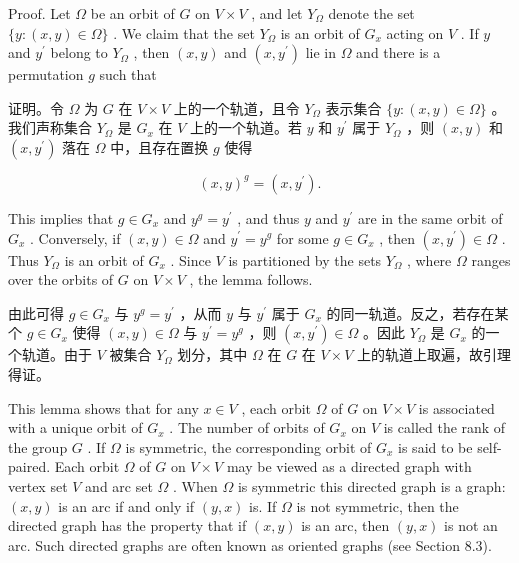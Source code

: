 \documentclass[10pt]{article}
\begin{document}
Proof. Let \(\Omega\) be an orbit of \(G\) on \(V \times  V\) , and let \({Y}_{\Omega }\) denote the set \(\{ y : \left( {x,y}\right)  \in  \Omega \}\) . We claim that the set \({Y}_{\Omega }\) is an orbit of \({G}_{x}\) acting on \(V\) . If \(y\) and \({y}^{\prime }\) belong to \({Y}_{\Omega }\) , then \(\left( {x,y}\right)\) and \(\left( {x,{y}^{\prime }}\right)\) lie in \(\Omega\) and there is a permutation \(g\) such that

\begin{tcolorbox}\relax
证明。令 \(\Omega\) 为 \(G\) 在 \(V \times  V\) 上的一个轨道，且令 \({Y}_{\Omega }\) 表示集合 \(\{ y : \left( {x,y}\right)  \in  \Omega \}\) 。我们声称集合 \({Y}_{\Omega }\) 是 \({G}_{x}\) 在 \(V\) 上的一个轨道。若 \(y\) 和 \({y}^{\prime }\) 属于 \({Y}_{\Omega }\) ，则 \(\left( {x,y}\right)\) 和 \(\left( {x,{y}^{\prime }}\right)\) 落在 \(\Omega\) 中，且存在置换 \(g\) 使得
\end{tcolorbox}

\[
{\left( x,y\right) }^{g} = \left( {x,{y}^{\prime }}\right) .
\]

This implies that \(g \in  {G}_{x}\) and \({y}^{g} = {y}^{\prime }\) , and thus \(y\) and \({y}^{\prime }\) are in the same orbit of \({G}_{x}\) . Conversely, if \(\left( {x,y}\right)  \in  \Omega\) and \({y}^{\prime } = {y}^{g}\) for some \(g \in  {G}_{x}\) , then \(\left( {x,{y}^{\prime }}\right)  \in  \Omega\) . Thus \({Y}_{\Omega }\) is an orbit of \({G}_{x}\) . Since \(V\) is partitioned by the sets \({Y}_{\Omega }\) , where \(\Omega\) ranges over the orbits of \(G\) on \(V \times  V\) , the lemma follows.

\begin{tcolorbox}\relax
由此可得 \(g \in  {G}_{x}\) 与 \({y}^{g} = {y}^{\prime }\) ，从而 \(y\) 与 \({y}^{\prime }\) 属于 \({G}_{x}\) 的同一轨道。反之，若存在某个 \(g \in  {G}_{x}\) 使得 \(\left( {x,y}\right)  \in  \Omega\) 与 \({y}^{\prime } = {y}^{g}\) ，则 \(\left( {x,{y}^{\prime }}\right)  \in  \Omega\) 。因此 \({Y}_{\Omega }\) 是 \({G}_{x}\) 的一个轨道。由于 \(V\) 被集合 \({Y}_{\Omega }\) 划分，其中 \(\Omega\) 在 \(G\) 在 \(V \times  V\) 上的轨道上取遍，故引理得证。
\end{tcolorbox}

This lemma shows that for any \(x \in  V\) , each orbit \(\Omega\) of \(G\) on \(V \times  V\) is associated with a unique orbit of \({G}_{x}\) . The number of orbits of \({G}_{x}\) on \(V\) is called the rank of the group \(G\) . If \(\Omega\) is symmetric, the corresponding orbit of \({G}_{x}\) is said to be self-paired. Each orbit \(\Omega\) of \(G\) on \(V \times  V\) may be viewed as a directed graph with vertex set \(V\) and arc set \(\Omega\) . When \(\Omega\) is symmetric this directed graph is a graph: \(\left( {x,y}\right)\) is an arc if and only if \(\left( {y,x}\right)\) is. If \(\Omega\) is not symmetric, then the directed graph has the property that if \(\left( {x,y}\right)\) is an arc, then \(\left( {y,x}\right)\) is not an arc. Such directed graphs are often known as oriented graphs (see Section 8.3).
\end{document}
